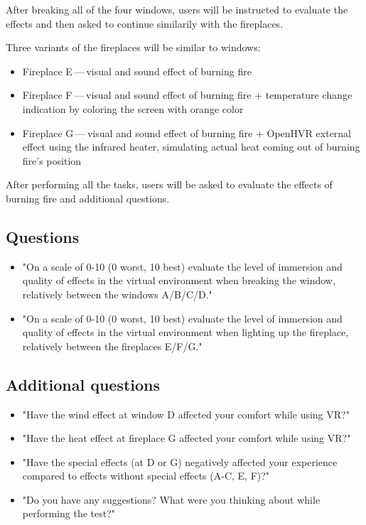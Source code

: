 After breaking all of the four windows, users will be instructed to evaluate
the effects and then asked to continue similarily with the fireplaces.


Three variants of the fireplaces will be similar to windows:


\begin{itemize}

\item Fireplace E — visual and sound effect of burning fire

\item Fireplace F — visual and sound effect of burning fire + temperature change
indication by coloring the screen with orange color

\item Fireplace G — visual and sound effect of burning fire + OpenHVR
external effect using the infrared heater, simulating actual heat coming
out of burning fire’s position

\end{itemize}


After performing all the tasks, users will be asked to evaluate the
effects of burning fire and additional questions.


\hypertarget{x-questions}{\subsection{Questions}}
\begin{itemize}

\item "On a scale of 0-10 (0 worst, 10 best) evaluate the level of immersion and quality
of effects in the virtual environment when breaking the window, relatively
between the windows A/B/C/D."

\item "On a scale of 0-10 (0 worst, 10 best) evaluate the level of immersion and quality
of effects in the virtual environment when lighting up the fireplace, relatively
between the fireplaces E/F/G."

\end{itemize}


\hypertarget{x-additional-questions}{\subsection{Additional questions}}
\begin{itemize}

\item "Have the wind effect at window D affected your comfort while using VR?"

\item "Have the heat effect at fireplace G affected your comfort while using VR?"

\item "Have the special effects (at D or G) negatively affected your experience
compared to effects without special effects (A-C, E, F)?"

\item "Do you have any suggestions? What were you thinking about while performing
the test?"

\end{itemize}


